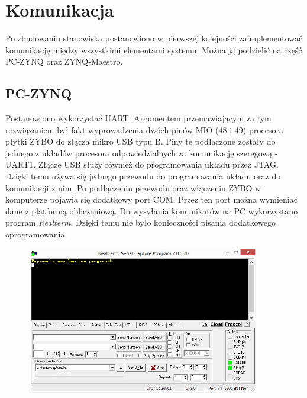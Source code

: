 \chapter{Komunikacja}
\label{cha:komunikacja}

Po zbudowaniu stanowiska postanowiono w pierwszej kolejności zaimplementować komunikację między wszystkimi elementami systemu. Można ją podzielić na część PC-ZYNQ oraz ZYNQ-Maestro.

\section{PC-ZYNQ}
\label{sec:pc-zynq}
Postanowiono wykorzystać UART. Argumentem przemawiającym za tym rozwiązaniem był fakt wyprowadzenia dwóch pinów MIO (48 i 49) procesora płytki ZYBO do złącza mikro USB typu B. Piny te podłączone zostały do jednego z układów procesora odpowiedzialnych za komunikację szeregową - UART1. Złącze USB służy również do programowania układu przez JTAG. Dzięki temu używa się jednego przewodu do programowania układu oraz do komunikacji z nim. Po podłączeniu przewodu oraz włączeniu ZYBO w komputerze pojawia się dodatkowy port COM. Przez ten port można wymieniać dane z platformą obliczeniową. Do wysyłania komunikatów na PC wykorzystano program \textit{Realterm}. Dzięki temu nie było konieczności pisania dodatkowego oprogramowania.

\begin{figure}[h]
	\centering
	\includegraphics[width=4in]{realterm.jpg}
\end{figure}


